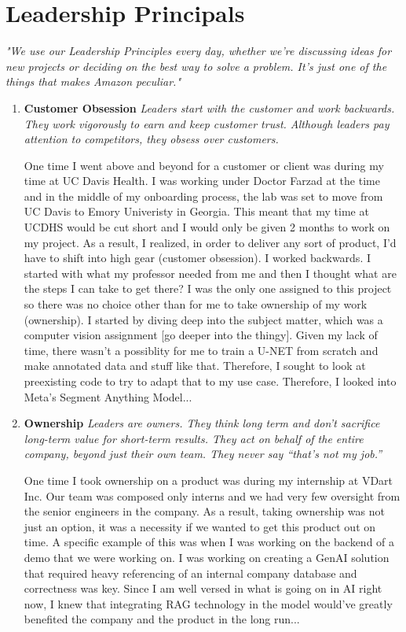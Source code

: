 \documentclass{article}
\begin{document}
\section{Leadership Principals}
\textit{"We use our Leadership Principles every day, whether we’re discussing ideas for new projects or deciding on the best way to solve a problem. It’s just one of the things that makes Amazon peculiar."}
\begin{enumerate}
\item \textbf{Customer Obsession} \textit{Leaders start with the customer and work backwards. They work vigorously to earn and keep customer trust. Although leaders pay attention to competitors, they obsess over customers.}

One time I went above and beyond for a customer or client was during my time at UC Davis Health. I was working under Doctor Farzad at the time and in the middle of my onboarding process, the lab was set to move from UC Davis to Emory Univeristy in Georgia. This meant that my time at UCDHS would be cut short and I would only be given 2 months to work on my project. As a result, I realized, in order to deliver any sort of product, I'd have to shift into high gear (customer obsession). I worked backwards. I started with what my professor needed from me and then I thought what are the steps I can take to get there? I was the only one assigned to this project so there was no choice other than for me to take ownership of my work (ownership). I started by diving deep into the subject matter, which was a computer vision assignment [go deeper into the thingy]. Given my lack of time, there wasn't a possiblity for me to train a U-NET from scratch and make annotated data and stuff like that. Therefore, I sought to look at preexisting code to try to adapt that to my use case. Therefore, I looked into Meta's Segment Anything Model...

\item \textbf{Ownership} \textit{Leaders are owners. They think long term and don’t sacrifice long-term value for short-term results. They act on behalf of the entire company, beyond just their own team. They never say “that’s not my job.”}

One time I took ownership on a product was during my internship at VDart Inc. Our team was composed only interns and we had very few oversight from the senior engineers in the company. As a result, taking ownership was not just an option, it was a necessity if we wanted to get this product out on time. A specific example of this was when I was working on the backend of a demo that we were working on. I was working on creating a GenAI solution that required heavy referencing of an internal company database and correctness was key. Since I am well versed in what is going on in AI right now, I knew that integrating RAG technology in the model would've greatly benefited the company and the product in the long run... 


\end{enumerate}
\end{document}
